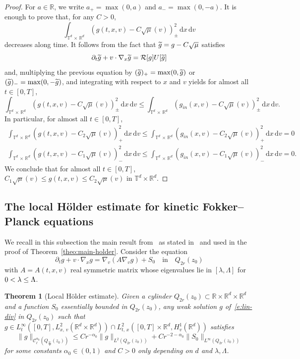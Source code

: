 \documentclass[10pt]{amsart}
\newtheorem{theo}{Theorem}[section]
\theoremstyle{definition}\newtheorem{defi}[theo]{Definition}\newtheorem{rema}[theo]{Remark}\newtheorem{exam}[theo]{Example}\newtheorem{exem}[theo]{Example}\newtheorem{nota}[theo]{Notation}
\newcommand{\R}{\mathbb{R}}
\newcommand{\T}{\mathbb{T}}
\newcommand{\cC}{\mathcal{C}}
\newcommand*\fR{\mathcal{R}}
\newcommand{\dd}{{\, \mathrm d}}
\let\oldtilde\tilde
\renewcommand*{\tilde}[1]{\mathchoice{\widetilde{#1}}{\widetilde{#1}}{\oldtilde{#1}}{\oldtilde{#1}}}
\begin{document}
\begin{proof}
For $a \in \R$, we write $a_+ = \max (0,a)$ and $a_- =
\max(0,-a)$. It is enough to prove that, for any $C>0$,
\[
\int_{\T^d\,\times\,\R^d} \left(g (t,x,v) - C \sqrt{\mu} (v)\right)^2_\pm \dd x \dd v
\]
decreases along time. It follows from the fact that $\tilde g = g - C\sqrt\mu$ satisfies
\[
\partial_t \tilde g + v \cdot \nabla_x \tilde g = \fR[g] U[\tilde g]
\]
and, multiplying the previous equation by $(\tilde g)_+ = \max (0,\tilde g)$ or $(\tilde g)_- = \max(0,-\tilde g)$, and integrating with respect to $x$ and $v$ yields for almost all $t \in [0,T]$,
\[
\int_{\T^d\,\times\,\R^d} \left(g (t,x,v) - C \sqrt{\mu} (v)\right)^2_\pm \dd x \dd v \le \int_{\T^d\,\times\,\R^d} \left(g_{in} (x,v) - C \sqrt{\mu} (v)\right)^2_\pm \dd x \dd v.
\]
In particular, for almost all $t \in [0,T]$,
\begin{align*}
\int_{\T^d\,\times\,\R^d} \left(g (t,x,v) - C_2 \sqrt{\mu} (v)\right)^2_+ \dd x \dd v \le \int_{\T^d\,\times\,\R^d} \left(g_{in} (x,v) - C_2 \sqrt{\mu} (v)\right)^2_+ \dd x \dd v = 0 \\
\int_{\T^d\,\times\,\R^d} \left(g (t,x,v) - C_1 \sqrt{\mu} (v)\right)^2_- \dd x \dd v \le \int_{\T^d\,\times\,\R^d} \left(g_{in} (x,v) - C_1 \sqrt{\mu} (v)\right)^2_- \dd x \dd v = 0.
\end{align*}
We conclude that for almost all $t \in [0,T]$, $C_1 \sqrt\mu (v) \le g (t,x,v) \le C_2 \sqrt\mu (v)$ in $\T^d \times \R^d$.
\end{proof}

\subsection{The local H\"older estimate for kinetic Fokker--Planck equations}\label{ss:holder}

We recall in this subsection the main result from~\cite{gimv,wz09} as stated in~\cite{gimv} and used in the proof of Theorem~\ref{theo:main-holder}. Consider the equation
\begin{equation}\label{e:lin-div}
\partial_t g + v \cdot \nabla_x g =
\nabla_v(A \nabla_v g) + S_0 \quad \text{in} \quad Q_{2r}(z_0)
\end{equation}
with $A=A(t,x,v)$ real symmetric matrix whose eigenvalues lie in $[\lambda,\Lambda]$ for $0 < \lambda\linebreak\le \Lambda$.

\begin{theo}[Local H\"older estimate]\label{t:gimv}
Given a cylinder $Q_{2r}(z_0) \subset \R \times \R^d \times \R^d$ and a function $S_0$ essentially bounded in $Q_{2r}(z_0)$, any weak solution $g$ of~\eqref{e:lin-div} in $Q_{2r}(z_0)$ such that $g \in L^\infty_t([0,T], L^2_{x,\,v} (\R^d \times \R^d)) \cap L^2_{t,\,x} ([0,T]
\times \R^d, H^1_v (\R^d))$ satisfies
\[
\| g\|_{\cC_\ell^{{\alpha_0}}\left(Q_{\frac{3r}2}(z_0)\right)} \le C r^{-{\alpha_0}} \| g \|_{L^2\left(Q_{2r}(z_0)\right)} + C r^{-2-{\alpha_0}}
\|S_0\|_{L^\infty\left(Q_{2r}(z_0)\right)}
\]
for some constants $\alpha_0 \in (0,1)$ and $C>0$ only depending on $d$ and $\lambda,\Lambda$.
\end{theo}
\end{document}
